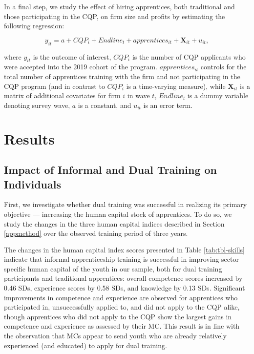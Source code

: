 \documentclass[
  a4paper, twoside, 12pt]{book}
\begin{document}
In a final step, we study the effect of hiring apprentices, both traditional and those participating in the CQP, on firm size and profits by estimating the following regression:

\[ y_{it} =  a+CQP_i+{Endline}_t+apprentices_{it}+\mathbf{X}_{it}+u_{it}, \]

where \(y_{it}\) is the outcome of interest, \(CQP_i\) is the number of CQP applicants who were accepted into the 2019 cohort of the program. \(apprentices_{it}\) controls for the total number of apprentices training with the firm and not participating in the CQP program (and in contrast to \(CQP_i\) is a time-varying measure), while \(\mathbf{X}_{it}\) is a matrix of additional covariates for firm \(i\) in wave \(t\), \({Endline}_t\) is a dummy variable denoting survey wave, \(a\) is a constant, and \(u_{it}\) is an error term.

\hypertarget{cqp_results}{%
\section{Results}\label{cqp_results}}

\hypertarget{appbenefits}{%
\subsection{Impact of Informal and Dual Training on Individuals}\label{appbenefits}}

First, we investigate whether dual training was successful in realizing its primary objective --- increasing the human capital stock of apprentices. To do so, we study the changes in the three human capital indices described in Section \ref{appmethod} over the observed training period of three years.

\begin{singlespacing}

\end{singlespacing}

The changes in the human capital index scores presented in Table \ref{tab:tbl-skills} indicate that informal apprenticeship training is successful in improving sector-specific human capital of the youth in our sample, both for dual training participants and traditional apprentices: overall competence scores increased by 0.46 SDs, experience scores by 0.58 SDs, and knowledge by 0.13 SDs. Significant improvements in competence and experience are observed for apprentices who participated in, unsuccessfully applied to, and did not apply to the CQP alike, though apprentices who did not apply to the CQP show the largest gains in competence and experience as assessed by their MC. This result is in line with the observation that MCs appear to send youth who are already relatively experienced (and educated) to apply for dual training.
\end{document}
